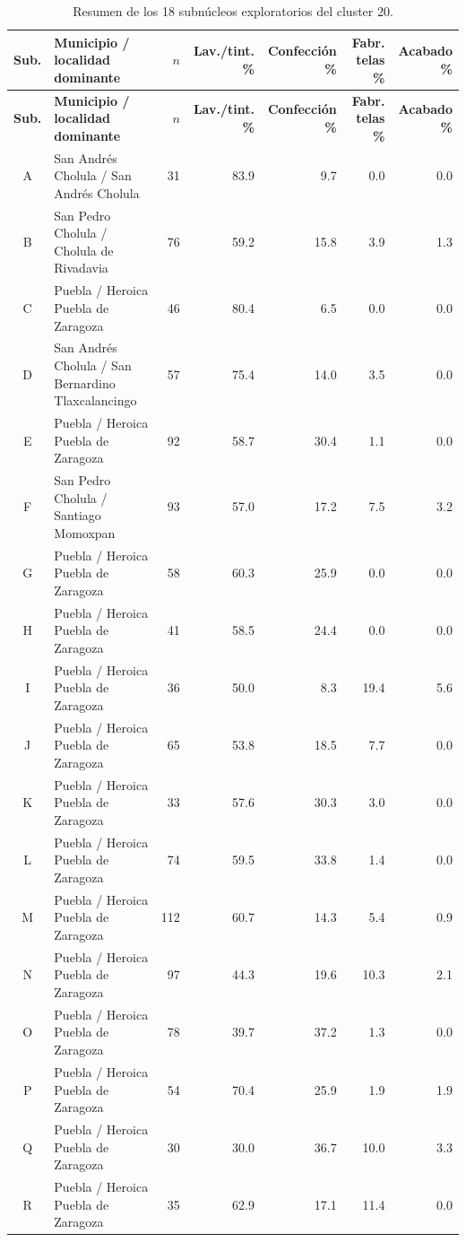 \documentclass[11pt,letterpaper]{article}
\begin{document}
\begin{landscape}
\footnotesize
\begin{longtable}{c p{6.5cm} r r r r r}
\caption{Resumen de los 18 subnúcleos exploratorios del cluster 20.}\label{tab:subnucleos-resumen}\\
\toprule
\textbf{Sub.} & \textbf{Municipio / localidad dominante} & \textbf{$n$} & \textbf{Lav./tint. \%} & \textbf{Confección \%} & \textbf{Fabr. telas \%} & \textbf{Acabado \%} \\
\midrule
\endfirsthead
\toprule
\textbf{Sub.} & \textbf{Municipio / localidad dominante} & \textbf{$n$} & \textbf{Lav./tint. \%} & \textbf{Confección \%} & \textbf{Fabr. telas \%} & \textbf{Acabado \%} \\
\midrule
\endhead
A & San Andrés Cholula / San Andrés Cholula & 31 & 83.9 & 9.7 & 0.0 & 0.0 \\
B & San Pedro Cholula / Cholula de Rivadavia & 76 & 59.2 & 15.8 & 3.9 & 1.3 \\
C & Puebla / Heroica Puebla de Zaragoza & 46 & 80.4 & 6.5 & 0.0 & 0.0 \\
D & San Andrés Cholula / San Bernardino Tlaxcalancingo & 57 & 75.4 & 14.0 & 3.5 & 0.0 \\
E & Puebla / Heroica Puebla de Zaragoza & 92 & 58.7 & 30.4 & 1.1 & 0.0 \\
F & San Pedro Cholula / Santiago Momoxpan & 93 & 57.0 & 17.2 & 7.5 & 3.2 \\
G & Puebla / Heroica Puebla de Zaragoza & 58 & 60.3 & 25.9 & 0.0 & 0.0 \\
H & Puebla / Heroica Puebla de Zaragoza & 41 & 58.5 & 24.4 & 0.0 & 0.0 \\
I & Puebla / Heroica Puebla de Zaragoza & 36 & 50.0 & 8.3 & 19.4 & 5.6 \\
J & Puebla / Heroica Puebla de Zaragoza & 65 & 53.8 & 18.5 & 7.7 & 0.0 \\
K & Puebla / Heroica Puebla de Zaragoza & 33 & 57.6 & 30.3 & 3.0 & 0.0 \\
L & Puebla / Heroica Puebla de Zaragoza & 74 & 59.5 & 33.8 & 1.4 & 0.0 \\
M & Puebla / Heroica Puebla de Zaragoza & 112 & 60.7 & 14.3 & 5.4 & 0.9 \\
N & Puebla / Heroica Puebla de Zaragoza & 97 & 44.3 & 19.6 & 10.3 & 2.1 \\
O & Puebla / Heroica Puebla de Zaragoza & 78 & 39.7 & 37.2 & 1.3 & 0.0 \\
P & Puebla / Heroica Puebla de Zaragoza & 54 & 70.4 & 25.9 & 1.9 & 1.9 \\
Q & Puebla / Heroica Puebla de Zaragoza & 30 & 30.0 & 36.7 & 10.0 & 3.3 \\
R & Puebla / Heroica Puebla de Zaragoza & 35 & 62.9 & 17.1 & 11.4 & 0.0 \\
\bottomrule
\end{longtable}
\normalsize
\end{landscape}
\end{document}
